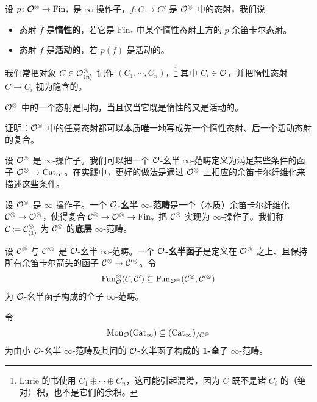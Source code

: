 \begin{definition}\label{L21-2.12}
设 $p\colon\mathcal{O}^{\otimes}\to\mathrm{Fin}_{*}$ 是 $\infty$-操作子，$f\colon C\to C'$ 是 $\mathcal{O}^{\otimes}$ 中的态射，我们说
\begin{itemize}[leftmargin=2.2em,itemsep=0.1em]
\item 态射 $f$ 是\textbf{惰性的}，若它是 $\mathrm{Fin}_{*}$ 中某个惰性态射上方的 $p$-余笛卡尔态射。
\item 态射 $f$ 是\textbf{活动的}，若 $p(f)$ 是活动的。
\end{itemize}
\end{definition}

\nitem\label{L21-2.13} 我们常把对象 $C\in\mathcal{O}^{\otimes}_{\langle n\rangle}$ 记作 $(C_1,\cdots,C_n)$，\footnote{Lurie 的书使用 $C_1\oplus\cdots\oplus C_n$，这可能引起混淆，因为 $C$ 既不是诸 $C_i$ 的（绝对）积，也不是它们的余积。} 其中 $C_i\in\mathcal{O}$，并把惰性态射 $C\to C_i$ 视为隐含的。

\begin{exercise}\label{L21-2.14}
$\mathcal{O}^{\otimes}$ 中的一个态射是同构，当且仅当它既是惰性的又是活动的。
\end{exercise}

\begin{exercise}\label{L21-2.15}
证明：$\mathcal{O}^{\otimes}$ 中的任意态射都可以本质唯一地写成先一个惰性态射、后一个活动态射的复合。
\end{exercise}

\nitem\label{L21-2.16} 设 $\mathcal{O}^{\otimes}$ 是 $\infty$-操作子。我们可以把一个 $\mathcal{O}$-幺半 $\infty$-范畴定义为满足某些条件的函子 $\mathcal{O}^{\otimes}\to\operatorname{Cat}_{\infty}$。在实践中，更好的做法是通过 $\mathcal{O}^{\otimes}$ 上相应的余笛卡尔纤维化来描述这些条件。

\begin{definition}\label{L21-2.17}
设 $\mathcal{O}^{\otimes}$ 是 $\infty$-操作子。一个 \textbf{$\mathcal{O}$-幺半 $\infty$-范畴}是一个（本质）余笛卡尔纤维化 $\mathcal{C}^{\otimes}\to\mathcal{O}^{\otimes}$，使得复合 $\mathcal{C}^{\otimes}\to\mathcal{O}^{\otimes}\to\mathrm{Fin}_{*}$ 把 $\mathcal{C}^{\otimes}$ 实现为 $\infty$-操作子。我们称 $\mathcal{C}\coloneqq\mathcal{C}^{\otimes}_{\langle 1\rangle}$ 为 $\mathcal{C}^{\otimes}$ 的\textbf{底层} $\infty$-范畴。
\end{definition}

\begin{definition}\label{L21-2.18}
设 $\mathcal{C}^{\otimes}$ 与 $\mathcal{C}^{\prime\otimes}$ 是 $\mathcal{O}$-幺半 $\infty$-范畴。一个 \textbf{$\mathcal{O}$-幺半函子}是定义在 $\mathcal{O}^{\otimes}$ 之上、且保持所有余笛卡尔箭头的函子 $\mathcal{C}^{\otimes}\to\mathcal{C}^{\prime\otimes}$。令
\[
\operatorname{Fun}^{\otimes}_{\mathcal{O}}(\mathcal{C},\mathcal{C}')\subseteq\operatorname{Fun}_{\mathcal{O}^{\otimes}}(\mathcal{C}^{\otimes},\mathcal{C}^{\prime\otimes})
\]
为 $\mathcal{O}$-幺半函子构成的全子 $\infty$-范畴。

令
\[
\operatorname{Mon}_{\mathcal{O}}(\operatorname{Cat}_{\infty})\subseteq(\operatorname{Cat}_{\infty})_{/\mathcal{O}^{\otimes}}
\]
为由小 $\mathcal{O}$-幺半 $\infty$-范畴及其间的 $\mathcal{O}$-幺半函子构成的 \textbf{1-全}子 $\infty$-范畴。
\end{definition}

